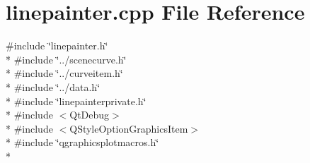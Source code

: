 \section{linepainter.\+cpp File Reference}
\label{curve_2painters_2linepainter_8cpp}
{\ttfamily \#include \char`\"{}linepainter.\+h\char`\"{}}\\*
{\ttfamily \#include \char`\"{}../scenecurve.\+h\char`\"{}}\\*
{\ttfamily \#include \char`\"{}../curveitem.\+h\char`\"{}}\\*
{\ttfamily \#include \char`\"{}../data.\+h\char`\"{}}\\*
{\ttfamily \#include \char`\"{}linepainterprivate.\+h\char`\"{}}\\*
{\ttfamily \#include $<$Qt\+Debug$>$}\\*
{\ttfamily \#include $<$Q\+Style\+Option\+Graphics\+Item$>$}\\*
{\ttfamily \#include \char`\"{}qgraphicsplotmacros.\+h\char`\"{}}\\*
